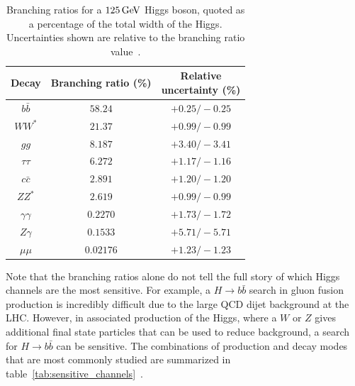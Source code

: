 \begin{table}[h!]
\centering
\captionsetup{justification=centering}

\hspace{-10pt}
\begin{tabular}{|c|c|c|}
\hline
Decay & Branching ratio (\%) & \specialcell{Relative\\uncertainty (\%)} \\ \hline
$b\bar{b}$ & $58.24$ & $+0.25/-0.25$\\ \hline
$WW^*$ & $21.37$ & $+0.99/-0.99$ \\ \hline
$gg$ & $8.187$ & $+3.40/-3.41$ \\ \hline
$\tau\tau$ & $6.272$ & $+1.17/-1.16$ \\ \hline
$c\bar{c}$ & $2.891$ & $+1.20/-1.20$ \\ \hline
$ZZ^*$ & $2.619$ & $+0.99/-0.99$ \\ \hline
$\gamma\gamma$ & $0.2270$ & $+1.73/-1.72$ \\ \hline
$Z\gamma$ & $0.1533$ & $+5.71/-5.71$ \\ \hline
$\mu\mu$ & $0.02176$ & $+1.23/-1.23$ \\ \hline
\end{tabular}

\caption{
Branching ratios for a $125 \GeV$ Higgs boson, quoted as a percentage of the total width of the Higgs. Uncertainties shown are relative to the branching ratio value~\cite{LHCXSWG}. 
}
\label{tab:Higgs_BR}
\end{table}

Note that the branching ratios alone do not tell the full story of which Higgs channels are the most sensitive. For example, a $H\to b\bar{b}$ search in gluon fusion production is incredibly difficult due to the large QCD dijet background at the LHC. However, in associated production of the Higgs, where a $W$ or $Z$ gives additional final state particles that can be used to reduce background, a search for $H\to b\bar{b}$ can be sensitive. The combinations of production and decay modes that are most commonly studied are summarized in table~\ref{tab:sensitive_channels}~\cite{Tully}.

